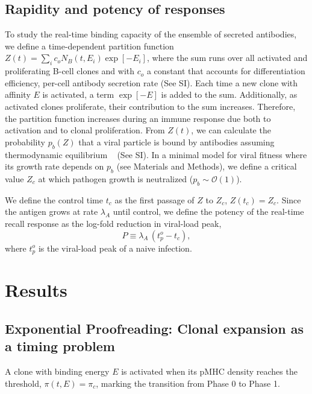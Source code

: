 \documentclass[aps, pre, twocolumn, 10pt, groupedaddress, superscriptaddress, linenumbers]{revtex4-2}
\newcommand{\EQ}{\begin{equation}}
\newcommand{\EE}{\end{equation}}
\newcommand{\DG}{E}
\newcommand{\lam}{\lambda}
\begin{document}
\subsection*{Rapidity and potency of responses}
To study the real-time binding capacity of the ensemble of secreted antibodies, we define a time-dependent partition function $Z(t) = \sum_i c_oN_B(t,\DG_i) \exp[-\DG_i]$, where the sum runs over all activated and proliferating B-cell clones and with $c_o$ a constant that accounts for differentiation efficiency, per-cell antibody secretion rate (See SI).
Each time a new clone with affinity $\DG$ is activated, a term $\exp[-\DG]$ is added to the sum.
Additionally, as activated clones proliferate, their contribution to the sum increases.
Therefore, the partition function increases during an immune response due both to activation and to clonal proliferation.
From $Z(t)$, we can calculate the probability $p_b(Z)$ that a viral particle is bound by antibodies assuming thermodynamic equilibrium ~\cite{phillips_physical_2019} (See SI).
In a minimal model for viral fitness where its growth rate depends on $p_b$ (see Materials and Methods), we define a critical value $Z_c$ at which pathogen growth is neutralized ($p_b\sim \mathcal O(1)$).

We define the control time $t_c$ as the first passage of $Z$ to $Z_c$, $Z(t_c) = Z_c$.
Since the antigen grows at rate $\lam_A$ until control, we define the potency of the real-time recall response as the log-fold reduction in viral-load peak,
\EQ
P \equiv \lam_A\,(t_p^o - t_c),
\label{eq:P}
\EE
where $t_p^o$ is the viral-load peak of a naive infection.


\section*{Results}

\subsection*{Exponential Proofreading: Clonal expansion as a timing problem}
A clone with binding energy $\DG$ is activated when its pMHC density reaches the threshold, $\pi(t,\DG)=\pi_c$, marking the transition from Phase 0 to Phase 1.
\end{document}
